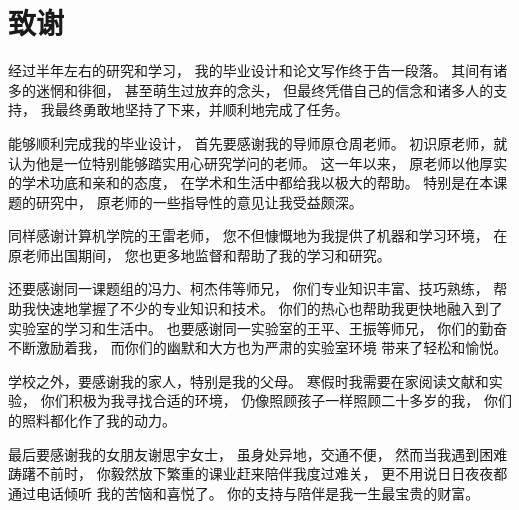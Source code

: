 \chapter*{致谢}
经过半年左右的研究和学习，
我的毕业设计和论文写作终于告一段落。
其间有诸多的迷惘和徘徊，
甚至萌生过放弃的念头，
但最终凭借自己的信念和诸多人的支持，
我最终勇敢地坚持了下来，并顺利地完成了任务。

能够顺利完成我的毕业设计，
首先要感谢我的导师原仓周老师。
初识原老师，就认为他是一位特别能够踏实用心研究学问的老师。
这一年以来，
原老师以他厚实的学术功底和亲和的态度，
在学术和生活中都给我以极大的帮助。
特别是在本课题的研究中，
原老师的一些指导性的意见让我受益颇深。

同样感谢计算机学院的王雷老师，
您不但慷慨地为我提供了机器和学习环境，
在原老师出国期间，
您也更多地监督和帮助了我的学习和研究。

还要感谢同一课题组的冯力、柯杰伟等师兄，
你们专业知识丰富、技巧熟练，
帮助我快速地掌握了不少的专业知识和技术。
你们的热心也帮助我更快地融入到了实验室的学习和生活中。
也要感谢同一实验室的王平、王振等师兄，
你们的勤奋不断激励着我，
而你们的幽默和大方也为严肃的实验室环境
带来了轻松和愉悦。

学校之外，要感谢我的家人，特别是我的父母。
寒假时我需要在家阅读文献和实验，
你们积极为我寻找合适的环境，
仍像照顾孩子一样照顾二十多岁的我，
你们的照料都化作了我的动力。

最后要感谢我的女朋友谢思宇女士，
虽身处异地，交通不便，
然而当我遇到困难踌躇不前时，
你毅然放下繁重的课业赶来陪伴我度过难关，
更不用说日日夜夜都通过电话倾听
我的苦恼和喜悦了。
你的支持与陪伴是我一生最宝贵的财富。

\cleardoublepage
